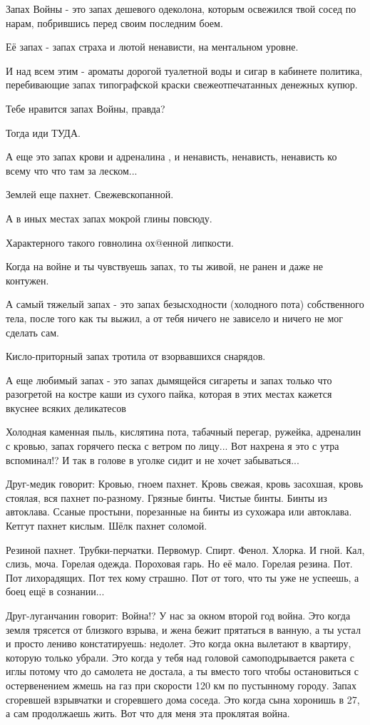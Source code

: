 \documentclass[a4paper,11pt]{extreport}
\begin{document}
Запах Войны - это запах дешевого одеколона, которым освежился твой сосед по
нарам, побрившись перед своим последним боем.

Её запах - запах страха и лютой ненависти, на ментальном уровне.

И над всем этим - ароматы дорогой туалетной воды и сигар в кабинете политика,
перебивающие запах типографской краски свежеотпечатанных денежных купюр.

Тебе нравится запах Войны, правда?

Тогда иди ТУДА.

А еще это запах крови и адреналина , и ненависть, ненависть, ненависть ко всему
что что там за леском...

Землей еще пахнет. Свежевскопанной.

А в иных местах запах мокрой глины повсюду.

Характерного такого говнолина ох@енной липкости.

Когда на войне и ты чувствуешь запах, то ты живой, не ранен и даже не контужен.

А самый тяжелый запах - это запах безысходности (холодного пота) собственного
тела, после того как ты выжил, а от тебя ничего не зависело и ничего не мог
сделать сам.

Кисло-приторный запах тротила от взорвавшихся снарядов.

А еще любимый запах - это запах дымящейся сигареты и запах только что
разогретой на костре каши из сухого пайка, которая в этих местах кажется
вкуснее всяких деликатесов

Холодная каменная пыль, кислятина пота, табачный перегар, ружейка, адреналин с
кровью, запах горячего песка с ветром по лицу... Вот нахрена я это с утра
вспоминал!? И так в голове в уголке сидит и не хочет забываться...

Друг-медик говорит: Кровью, гноем пахнет. Кровь свежая, кровь засохшая, кровь
стоялая, вся пахнет по-разному. Грязные бинты. Чистые бинты. Бинты из
автоклава. Ссаные простыни, порезанные на бинты из сухожара или автоклава.
Кетгут пахнет кислым. Шёлк пахнет соломой.

Резиной пахнет. Трубки-перчатки. Первомур. Спирт. Фенол. Хлорка. И гной. Кал,
слизь, моча. Горелая одежда. Пороховая гарь. Но её мало. Горелая резина. Пот.
Пот лихорадящих. Пот тех кому страшно. Пот от того, что ты уже не успеешь, а
боец ещё в сознании...

Друг-луганчанин говорит: Война!? У нас за окном второй год война. Это когда
земля трясется от близкого взрыва, и жена бежит прятаться в ванную, а ты устал
и просто лениво констатируешь: недолет. Это когда окна вылетают в квартиру,
которую только убрали. Это когда у тебя над головой самоподрывается ракета с
иглы потому что до самолета не достала, а ты вместо того чтобы остановиться с
остервенением жмешь на газ при скорости 120 км по пустынному городу. Запах
сгоревшей взрывчатки и сгоревшего дома соседа. Это когда сына хоронишь в 27, а
сам продолжаешь жить. Вот что для меня эта проклятая война.
\end{document}
